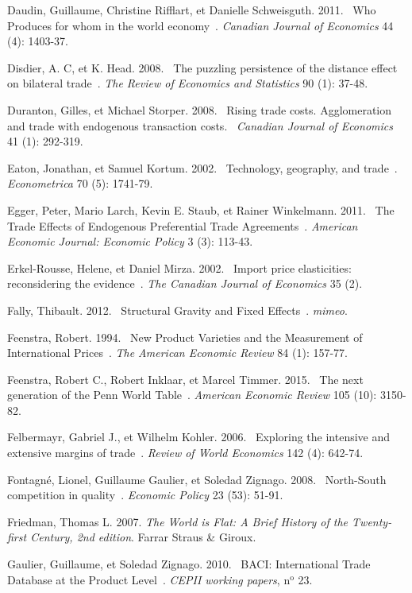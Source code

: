 \documentclass[12pt,twoside,a4paper,notitlepage]{article}
\begin{document}
Daudin, Guillaume, Christine Rifflart, et Danielle Schweisguth. 2011. {\flqq}~Who Produces for whom in the world economy~{\frqq}. \textit{Canadian Journal of Economics} 44 (4): 1403\hbox{-}37.

Disdier, A. C, et K. Head. 2008. {\flqq}~The puzzling persistence of the distance effect on bilateral trade~{\frqq}. \textit{The Review of Economics and Statistics} 90 (1): 37\hbox{-}48.

Duranton, Gilles, et Michael Storper. 2008. {\flqq}~Rising trade costs. Agglomeration and trade with endogenous transaction costs.~{\frqq} \textit{Canadian Journal of Economics} 41 (1): 292\hbox{-}319.

Eaton, Jonathan, et Samuel Kortum. 2002. {\flqq}~Technology, geography, and trade~{\frqq}. \textit{Econometrica} 70 (5): 1741\hbox{-}79.

Egger, Peter, Mario Larch, Kevin E. Staub, et Rainer Winkelmann. 2011. {\flqq}~The Trade Effects of Endogenous Preferential Trade Agreements~{\frqq}. \textit{American Economic Journal: Economic Policy} 3 (3): 113\hbox{-}43.

Erkel-Rousse, Helene, et Daniel Mirza. 2002. {\flqq}~Import price elasticities: reconsidering the evidence~{\frqq}. \textit{The Canadian Journal of Economics} 35 (2).

Fally, Thibault. 2012. {\flqq}~Structural Gravity and Fixed Effects~{\frqq}. \textit{mimeo}.

Feenstra, Robert. 1994. {\flqq}~New Product Varieties and the Measurement of International Prices~{\frqq}. \textit{The American Economic Review} 84 (1): 157\hbox{-}77.

Feenstra, Robert C., Robert Inklaar, et Marcel Timmer. 2015. {\flqq}~The next generation of the Penn World Table~{\frqq}. \textit{American Economic Review} 105 (10): 3150\hbox{-}82.

Felbermayr, Gabriel J., et Wilhelm Kohler. 2006. {\flqq}~Exploring the intensive and extensive margins of trade~{\frqq}. \textit{Review of World Economics} 142 (4): 642\hbox{-}74.

Fontagn\'{e}, Lionel, Guillaume Gaulier, et Soledad Zignago. 2008. {\flqq}~North-South competition in quality~{\frqq}. \textit{Economic Policy} 23 (53): 51\hbox{-}91.

Friedman, Thomas L. 2007. \textit{The World is Flat: A Brief History of the Twenty-first Century, 2nd edition}. Farrar Straus \& Giroux.

Gaulier, Guillaume, et Soledad Zignago. 2010. {\flqq}~BACI: International Trade Database at the Product Level~{\frqq}. \textit{CEPII working papers}, n$^{\mathrm{o}}$ 23.
\end{document}
